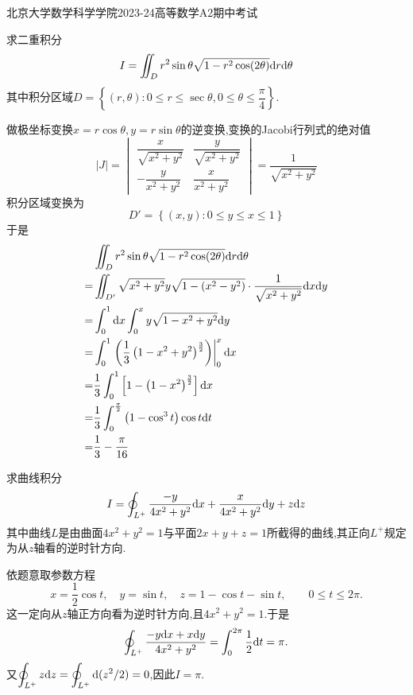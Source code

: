 \documentclass{ctexart}
\begin{document}
\pagestyle{empty}
\begin{center}\Large
    北京大学数学科学学院2023-24高等数学A2期中考试
\end{center}
\begin{problem}[1.(20\songti{分})]
    求二重积分
    \[I=\iint_{D}r^2\sin\theta\sqrt{1-r^2\cos(2\theta)}\mathrm{d} r\mathrm{d}\theta\]
    其中积分区域$D=\left\{(r,\theta):0\leqslant r\leqslant\sec\theta,0\leqslant\theta\leqslant\dfrac\pi4\right\}$.
\end{problem}
\begin{solution}
    做极坐标变换$x=r\cos\theta,y=r\sin\theta$的逆变换,变换的Jacobi行列式的绝对值
    \[|J|=\begin{vmatrix}
        \dfrac{x}{\sqrt{x^2+y^2}}&\dfrac{y}{\sqrt{x^2+y^2}}\\
        -\dfrac{y}{x^2+y^2}&\dfrac{x}{x^2+y^2}
    \end{vmatrix}=\dfrac{1}{\sqrt{x^2+y^2}}\]
    积分区域变换为
    \[D'=\left\{(x,y):0\leqslant y\leqslant x\leqslant 1\right\}\]
    于是
    \[\begin{aligned}
        &\iint_{D}r^2\sin\theta\sqrt{1-r^2\cos(2\theta)}\mathrm{d} r\mathrm{d}\theta\\
        =&\iint_{D'}\sqrt{x^2+y^2}y\sqrt{1-\left(x^2-y^2\right)}\cdot\dfrac{1}{\sqrt{x^2+y^2}}\mathrm{d} x\mathrm{d} y \\
        =&\int_0^1\mathrm{d} x\int_0^xy\sqrt{1-x^2+y^2}\mathrm{d} y \\
        =&\int_0^1\left.\left(\dfrac13\left(1-x^2+y^2\right)^{\frac32}\right)\right|_0^x\mathrm{d} x \\
        =&\dfrac13\int_0^1\left[1-\left(1-x^2\right)^{\frac32}\right]\mathrm{d} x \\
        =&\dfrac13\int_0^{\frac{\pi}{2}}\left(1-\cos^3t\right)\cos t\mathrm{d} t \\
        =&\dfrac13-\dfrac{\pi}{16}
    \end{aligned}\]

\end{solution}
\begin{problem}[2.(20\songti{分})]
    求曲线积分
    \[I=\oint_{L^+}\dfrac{-y}{4x^2+y^2}\mathrm{d} x+\dfrac{x}{4x^2+y^2}\mathrm{d} y+z\mathrm{d} z\]
    其中曲线$L$是由曲面$4x^2+y^2=1$与平面$2x+y+z=1$所截得的曲线,其正向$L^+$规定为从$z$轴看的逆时针方向.
\end{problem}
\begin{solution}
依题意取参数方程
    \[x=\dfrac12\cos t,\quad y=\sin t,\quad z=1-\cos t-\sin t,\qquad0\leqslant t\leqslant2\pi.\]
    这一定向从$z$轴正方向看为逆时针方向,且$4x^2+y^2=1$.于是
    \[\oint_{L^+}\dfrac{-y\mathrm{d} x+x\mathrm{d} y}{4x^2+y^2}
      =\int_0^{2\pi}\dfrac12\mathrm{d} t=\pi.\]
    又$\displaystyle\oint_{L^+}z\mathrm{d} z=\oint_{L^+}\mathrm{d}(z^2/2)=0$,因此$I=\pi$.
\end{solution}
\end{document}
